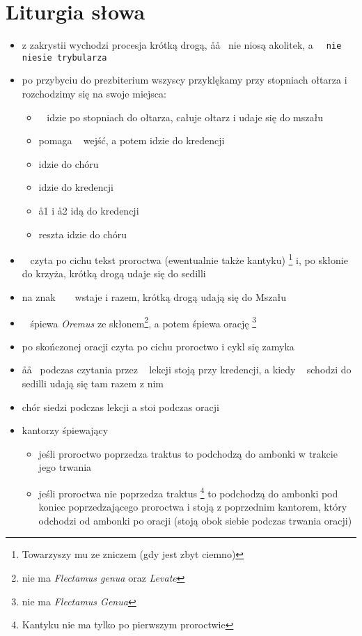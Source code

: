 \section{Liturgia słowa}

\begin{itemize}
	\item z zakrystii wychodzi procesja krótką drogą, \aa\aa~ nie niosą
	      akolitek, a \tt~ nie niesie trybularza
	\item po przybyciu do prezbiterium wszyscy przyklękamy przy stopniach
	      ołtarza i rozchodzimy się na swoje miejsca:
	      \begin{itemize}
		      \item \ii~ idzie po stopniach do ołtarza, całuje ołtarz i udaje
		            się do mszału
		      \item {} pomaga \ii~ wejść, a potem idzie do kredencji
		      \item {} idzie do chóru
		      \item {} idzie do kredencji
		      \item \aa1 i \aa2 idą do kredencji
		      \item reszta idzie do chóru
	      \end{itemize}
	\item \ii~ czyta po cichu tekst proroctwa (ewentualnie także kantyku)
	      \footnote{Towarzyszy mu  ze zniczem (gdy jest zbyt ciemno)} i, po
	      skłonie do krzyża, krótką drogą udaje się do sedilli

	\item na znak ~ \ii~ wstaje i razem, krótką drogą udają się do Mszału
	\item \ii~ śpiewa \textit{Oremus} ze skłonem\footnote{nie ma
		      \textit{Flectamus genua} oraz \textit{Levate}}, a potem śpiewa
	      orację
	      \footnote{nie ma \textit{Flectamus Genua}}
	\item po skończonej oracji czyta po cichu proroctwo i cykl się zamyka
	\item \aa\aa~ podczas czytania przez \ii~ lekcji stoją przy kredencji, a
	      kiedy \ii~ schodzi do sedilli udają się tam razem z nim
	\item chór siedzi podczas lekcji a stoi podczas oracji
	\item kantorzy śpiewający
	      \begin{itemize}
		      \item jeśli proroctwo poprzedza traktus to podchodzą do ambonki w
		            trakcie jego trwania
		      \item jeśli proroctwa nie poprzedza traktus \footnote{Kantyku nie
			            ma tylko po pierwszym proroctwie} to podchodzą do
		            ambonki pod koniec poprzedzającego proroctwa i stoją z
		            poprzednim kantorem, który odchodzi od ambonki po oracji
		            (stoją obok siebie podczas trwania oracji)
	      \end{itemize}
\end{itemize}